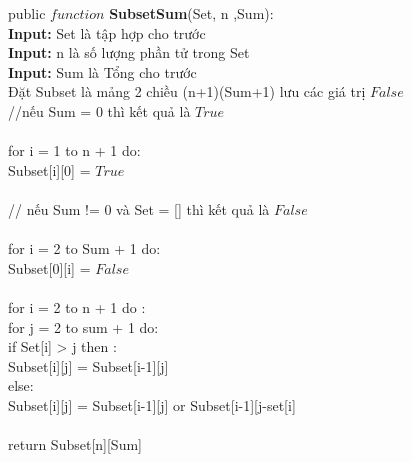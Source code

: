 \documentclass[a4paper]{article}
\newcommand\tab[1][1cm]{\hspace*{#1}}
\begin{document}
\begin{framed}
public $function$ \textbf{SubsetSum}(Set, n ,Sum):\\
\tab \textbf{Input: } Set là tập hợp cho trước\\
\tab \textbf{Input: } n là số lượng phần tử trong Set\\
\tab \textbf{Input: } Sum là Tổng cho trước\\
\tab Đặt Subset là mảng 2 chiều (n+1)(Sum+1) lưu các giá trị $False$\\
\tab //nếu Sum = 0 thì kết quả là $True$  \\ \\
\tab for i = 1 to n + 1 do:\\
\tab\tab Subset[i][0] = $True$\\ \\
\tab // nếu Sum != 0 và Set = [] thì kết quả là $False$ \\ \\ 
\tab for i = 2 to Sum + 1 do: \\
\tab\tab Subset[0][i] = $False$ \\ \\
\tab for i = 2 to n + 1 do : \\
\tab \tab for j = 2  to sum + 1 do:\\
\tab \tab \tab if Set[i] > j then : \\
\tab \tab \tab \tab Subset[i][j] = Subset[i-1][j] \\
\tab \tab \tab else: \\
\tab \tab \tab \tab Subset[i][j] = Subset[i-1][j] or Subset[i-1][j-set[i]\\ \\
\tab return Subset[n][Sum]


\tab\tab  \\
\tab 
\end{framed}
\end{document}
